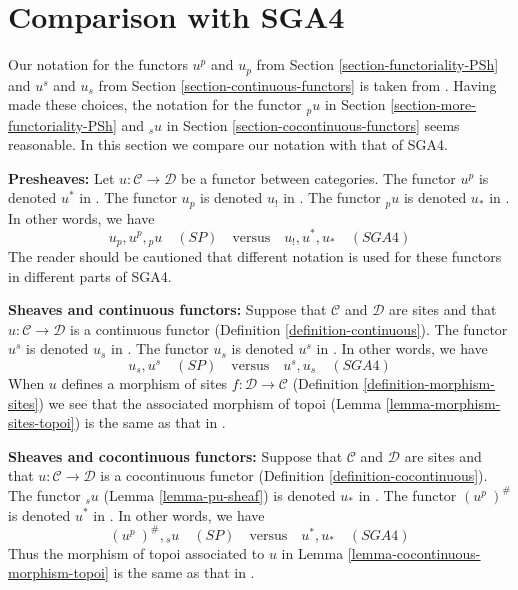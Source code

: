 \section{Comparison with SGA4}
\label{section-notation-comparison}

\noindent
Our notation for the functors
$u^p$ and $u_p$ from Section \ref{section-functoriality-PSh} and
$u^s$ and $u_s$ from Section \ref{section-continuous-functors}
is taken from \cite[pages 14 and 42]{ArtinTopologies}. Having made these
choices, the notation for the functor
${}_pu$ in Section \ref{section-more-functoriality-PSh} and
${}_su$ in Section \ref{section-cocontinuous-functors}
seems reasonable.
In this section we compare our notation with that of SGA4.

\medskip\noindent
{\bf Presheaves:} Let $u : \mathcal{C} \to \mathcal{D}$ be a functor
between categories.
The functor $u^p$ is denoted $u^*$ in \cite[Exposee I, Section 5]{SGA4}.
The functor $u_p$ is denoted $u_!$ in \cite[Exposee I, Proposition 5.1]{SGA4}.
The functor ${}_pu$ is denoted $u_*$ in
\cite[Exposee I, Proposition 5.1]{SGA4}.
In other words, we have
$$
u_p, u^p, {}_pu\quad(SP)
\quad\text{versus}\quad
u_!, u^*, u_*\quad(SGA4)
$$
The reader should be cautioned that different notation is used for these
functors in different parts of SGA4.

\medskip\noindent
{\bf Sheaves and continuous functors:}
Suppose that $\mathcal{C}$ and $\mathcal{D}$ are sites and that
$u : \mathcal{C} \to \mathcal{D}$ is
a continuous functor (Definition \ref{definition-continuous}).
The functor $u^s$ is denoted $u_s$ in \cite[Exposee III, 1.11]{SGA4}.
The functor $u_s$ is denoted $u^s$ in
\cite[Exposee III, Proposition 1.2]{SGA4}.
In other words, we have
$$
u_s, u^s\quad(SP)
\quad\text{versus}\quad
u^s, u_s\quad(SGA4)
$$
When $u$ defines a morphism of sites
$f : \mathcal{D} \to \mathcal{C}$
(Definition \ref{definition-morphism-sites})
we see that the associated morphism of topoi
(Lemma \ref{lemma-morphism-sites-topoi}) is the same as that in
\cite[Exposee IV, (4.9.1.1)]{SGA4}.

\medskip\noindent
{\bf Sheaves and cocontinuous functors:}
Suppose that $\mathcal{C}$ and $\mathcal{D}$ are sites and that
$u : \mathcal{C} \to \mathcal{D}$ is
a cocontinuous functor (Definition \ref{definition-cocontinuous}).
The functor ${}_su$ (Lemma \ref{lemma-pu-sheaf}) is denoted $u_*$ in
\cite[Exposee III, Proposition 2.3]{SGA4}.
The functor $(u^p\ )^\#$ is denoted $u^*$ in
\cite[Exposee III, Proposition 2.3]{SGA4}.
In other words, we have
$$
(u^p\ )^\#, {}_su\quad(SP)
\quad\text{versus}\quad
u^*, u_*\quad(SGA4)
$$
Thus the morphism of topoi associated to $u$ in
Lemma \ref{lemma-cocontinuous-morphism-topoi}
is the same as that in \cite[Exposee IV, 4.7]{SGA4}.

